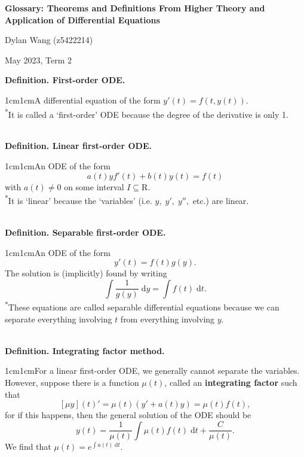 \documentclass{article}
\newcommand{\definition}[2]{\textbf{Definition. #1.}\begin{adjustwidth}{1cm}{1cm}#2\end{adjustwidth}}
\begin{document}
\begin{titlepage}
    \centering
    \vspace*{\fill}

    \vspace*{0.5cm}

    \huge\bfseries
    Glossary: Theorems and Definitions From Higher Theory and Application of Differential Equations

    \vspace*{2cm}

    \large Dylan Wang (z5422214)

    \vspace*{2cm}

    \large May 2023, Term 2

    \vspace*{\fill}
\end{titlepage}
\newpage

\definition{First-order ODE}{A differential equation of the form $y'(t) = f(t, y(t)).$\\\textsuperscript{*}It is called a `first-order' ODE because the degree of the derivative is only 1.} ~\\
\definition{Linear first-order ODE}{An ODE of the form \[a(t)yf'(t)+b(t)y(t)=f(t)\] with $a(t) \neq 0$ on some interval $I \subseteq \mathrm{R}$.\\\textsuperscript{*}It is `linear' because the `variables' (i.e. $y, \; y', \; y'',$ etc.) are linear.} ~\\
\definition{Separable first-order ODE}{An ODE of the form \[y'(t) = f(t)g(y).\]The solution is (implicitly) found by writing \[\int \frac{1}{g(y)} \; \mathrm{d}y = \int f(t) \; \mathrm{d}t.\]\textsuperscript{*}These equations are called separable differential equations because we can separate everything involving $t$ from everything involving $y$.} ~\\
\definition{Integrating factor method}{For a linear first-order ODE, we generally cannot separate the variables. However, suppose there is a function $\mu(t)$, called an \textbf{integrating factor} such that \[[\mu y](t)' = \mu(t)(y' + a(t)y) = \mu(t)f(t),\]for if this happens, then the general solution of the ODE should be \[y(t)=\frac{1}{\mu(t)}\int \mu(t) f(t) \; \mathrm{d}t + \frac{C}{\mu(t)}.\]We find that $\mu(t) = e^{\int a(t) \; \mathrm{d} t}.$}
\end{document}
